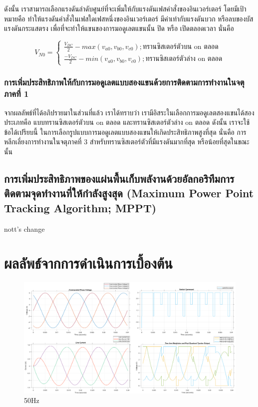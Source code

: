 \documentclass[11pt,a4paper]{article}
\begin{document}
ดังนั้น เราสามารถเลือกแรงดันลำดับศูนย์ที่จะเพิ่มให้กับแรงดันเฟสคำสั่งของอินเวอร์เตอร์ โดยมีเป้าหมายคือ ทำให้แรงดันคำสั่งในเฟสใดเฟสหนึ่งของอินเวอร์เตอร์ มีค่าเท่ากับแรงดันบวก หรือลบของบัสแรงดันกระแสตรง เพื่อที่จะทำให้แขนของการมอดูเลตแขนนั้น ปิด หรือ เปิดตลอดเวลา นั่นคือ

\begin{equation}
    V_{N0} = \begin{cases}
        \frac{V_{DC}}{2}-max(v_{a0},v_{b0},v_{c0}); \text{ทรานซิสเตอร์ตัวบน on ตลอด} \\
        \frac{-V_{DC}}{2}-min(v_{a0},v_{b0},v_{c0}); \text{ทรานซิสเตอร์ตัวล่าง on ตลอด}
    \end{cases}
\end{equation}

\subsubsection{การเพิ่มประสิทธิภาพให้กับการมอดูเลตแบบสองแขนด้วยการติดตามการทำงานในจตุภาคที่ 1}

จากผลลัพธ์ที่ได้อภิปรายมาในส่วนที่แล้ว เราได้ทราบว่า เรามีอิสระในเลือกการมอดูเลตสองแขนได้สองประเภทคือ แบบทรานซิสเตอร์ตัวบน on ตลอด และทรานซิสเตอร์ตัวล่าง on ตลอด ดังนั้น เราจะใช้ข้อได้เปรียบนี้ ในการเลือกรูปแบบการมอดูเลตแบบสองแขนให้เกิดประสิทธิภาพสูงที่สุด นั่นคือ การหลีกเลี่ยงการทำงานในจตุภาคที่ 3 สำหรับทรานซิสเตอร์ตัวที่มีแรงดันมากที่สุด หรือน้อยที่สุดในขณะนั้น

\subsection{การเพิ่มประสิทธิภาพของแผ่นพื้นเก็บพลังานด้วยอัลกอริทึมการติดตามจุดทำงานที่ให้กำลังสูงสุด (Maximum Power Point Tracking Algorithm; MPPT)}
nott's change
\newpage
\section{ผลลัพธ์จากการดำเนินการเบื้องต้น}
\begin{figure}[!htb]
    \centering
    \includegraphics[width=\textwidth]{VSI_6V_50Hz_3Ohm_10mH.eps}
    \caption{50Hz}

\end{figure}
\end{document}
